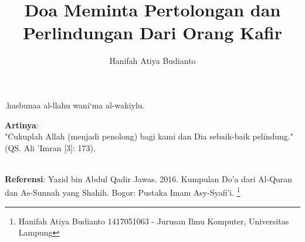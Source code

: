\documentclass[a4paper,12pt]{article}
\title{\Large Doa Meminta Pertolongan dan Perlindungan Dari Orang Kafir}
\author{\calligra Hanifah Atiya Budianto}
\begin{document}
\sffamily
\maketitle 
\fullvocalize
{}
\begin{arabtext}
\noindent
.hasbunaa al-llahu wani`ma al-wakiylu.\\
\end{arabtext}
\noindent
\textbf{Artinya}:\\
\indent
"Cukuplah Allah (menjadi penolong) bagi kami dan Dia sebaik-baik 
pelindung." (QS. Ali 'Imran [3]: 173).\\\\
\par
\noindent
\textbf{Referensi}: Yazid bin Abdul Qadir Jawas. 2016. Kumpulan Do'a dari
Al-Quran dan As-Sunnah yang Shahih. Bogor: Pustaka Imam Asy-Syafi'i.	
\footnote{Hanifah Atiya Budianto 1417051063 - Jurusan Ilmu Komputer,
Universitas Lampung}
\end{document}
